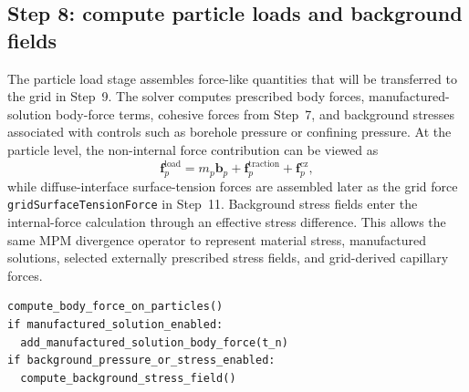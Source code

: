 \subsection{Step 8: compute particle loads and background fields}
\label{subsec:solver-step-8}
The particle load stage assembles force-like quantities that will be transferred to the grid in Step~9.  The solver computes prescribed body forces, manufactured-solution body-force terms, cohesive forces from Step~7, and background stresses associated with controls such as borehole pressure or confining pressure.  At the particle level, the non-internal force contribution can be viewed as
\begin{equation}
  \mathbf{f}_{p}^{\mathrm{load}} = m_p\mathbf{b}_p
  + \mathbf{f}_{p}^{\mathrm{traction}}
  + \mathbf{f}_{p}^{\mathrm{cz}},
\end{equation}
while diffuse-interface surface-tension forces are assembled later as the grid force \texttt{gridSurfaceTensionForce} in Step~11.  Background stress fields enter the internal-force calculation through an effective stress difference.  This allows the same MPM divergence operator to represent material stress, manufactured solutions, selected externally prescribed stress fields, and grid-derived capillary forces.

\begin{lstlisting}[caption={Particle load calculation.},basicstyle=\ttfamily\small]
compute_body_force_on_particles()
if manufactured_solution_enabled:
  add_manufactured_solution_body_force(t_n)
if background_pressure_or_stress_enabled:
  compute_background_stress_field()
\end{lstlisting}

